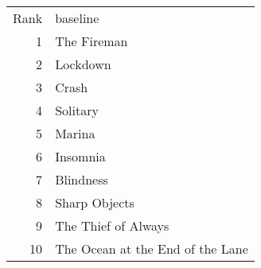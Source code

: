 \begin{tabular}{rl}
Rank & baseline \\
1 & The Fireman \\
2 & Lockdown \\
3 & Crash \\
4 & Solitary \\
5 & Marina \\
6 & Insomnia \\
7 & Blindness \\
8 & Sharp Objects \\
9 & The Thief of Always \\
10 & The Ocean at the End of the Lane \\
\end{tabular}
